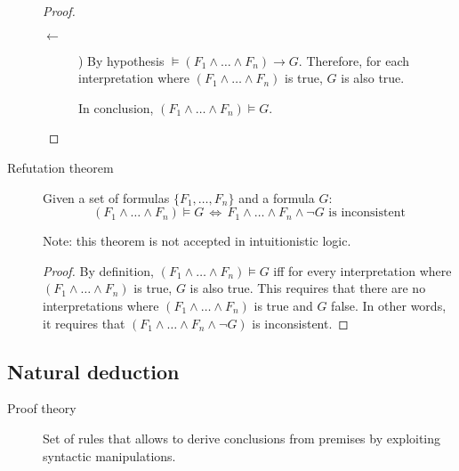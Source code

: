 \begin{description}
\begin{proof}
\begin{description}
                \item[$\leftarrow$]) 
                    By hypothesis $\models (F_1 \land \dots \land F_n) \rightarrow G$.
                    Therefore, for each interpretation where $(F_1 \land \dots \land F_n)$ is true,
                    $G$ is also true.
        
                    In conclusion, $(F_1 \land \dots \land F_n) \models G$.
            \end{description}
        \end{proof}

    \item[Refutation theorem] 
        Given a set of formulas $\{ F_1, \dots, F_n \}$ and a formula $G$:
        \[ (F_1 \land \dots \land F_n) \models G \,\iff\, F_1 \land \dots \land F_n \land \lnot G \text{ is inconsistent} \]
        
        Note: this theorem is not accepted in intuitionistic logic.
        
        \begin{proof}
            By definition, $(F_1 \land \dots \land F_n) \models G$ iff for every interpretation where 
            $(F_1 \land \dots \land F_n)$ is true, $G$ is also true.
            This requires that there are no interpretations where $(F_1 \land \dots \land F_n)$ is true and $G$ false.
            In other words, it requires that $(F_1 \land \dots \land F_n \land \lnot G)$ is inconsistent.
        \end{proof}
\end{description}




\subsection{Natural deduction}
\begin{description}
    \item[Proof theory] 
        Set of rules that allows to derive conclusions from premises by exploiting syntactic manipulations.
\end{description}


